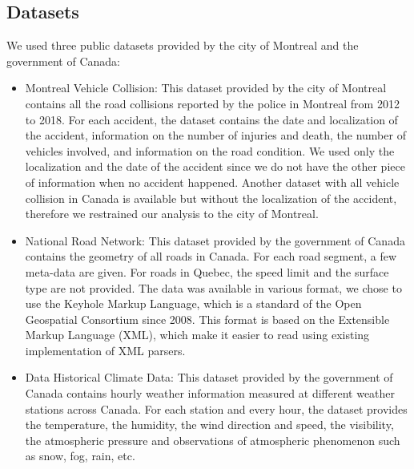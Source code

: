 \documentclass[conference]{IEEEtran}
\begin{document}
\subsection{Datasets}
We used three public datasets provided by the city of Montreal and the government of Canada: 
\begin{itemize}
\item Montreal Vehicle Collision: This dataset provided by the city of Montreal contains all the road collisions reported by the police in Montreal from 2012 to 2018. For each accident, the dataset contains the date and localization of the accident, information on the number of injuries and death, the number of vehicles involved, and information on the road condition. We used only the localization and the date of the accident since we do not have the other piece of information when no accident happened. Another dataset with all vehicle collision in Canada is available but without the localization of the accident, therefore we restrained our analysis to the city of Montreal.
\item National Road Network: This dataset provided by the government of Canada contains the geometry of all roads in Canada. For each road segment, a few meta-data are given. For roads in Quebec, the speed limit and the surface type are not provided. The data was available in various format, we chose to use the Keyhole Markup Language, which is a standard of the Open Geospatial Consortium since 2008. This format is based on the Extensible Markup Language (XML), which make it easier to read using existing implementation of XML parsers. 
\item Data Historical Climate Data: This dataset provided by the government of Canada contains hourly weather information measured at different weather stations across Canada. For each station and every hour, the dataset provides the temperature, the humidity, the wind direction and speed, the visibility, the atmospheric pressure and observations of atmospheric phenomenon such as snow, fog, rain, etc.
\end{itemize}
\end{document}
